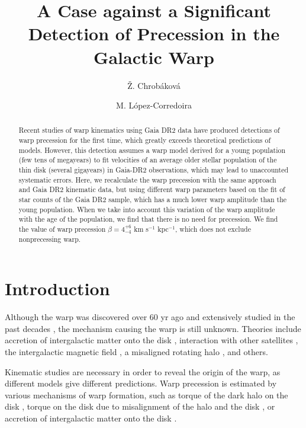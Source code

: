 \documentclass[twocolumn]{aastex63}
\begin{document}
	
	\title{A Case against a Significant Detection of Precession in the Galactic Warp}
	
	\author{\v{Z}. Chrob\'{a}kov\'{a}}
	
	\author{M. L\'{o}pez-Corredoira}
	
	\begin{abstract}
		Recent studies of warp kinematics using Gaia DR2 data have produced detections of warp precession for the first time, which greatly exceeds theoretical predictions of models. However, this detection assumes a warp model derived for a young population (few tens of megayears) to fit velocities of an average older stellar population of the thin disk (several gigayears) in Gaia-DR2 observations, which may lead to unaccounted systematic errors.
		Here, we recalculate the warp precession with the same approach and Gaia DR2 kinematic data, but using different warp parameters based on the fit of star counts of the Gaia DR2 sample, which has a much lower warp amplitude than the young population. When we take into account this variation of the warp amplitude with the age of the population, we find that there is no need for precession. We find the value of warp precession $\beta = 4^{+6}_{-4}$ km s$^{-1}$ kpc$^{-1}$, which does not exclude nonprecessing warp.
	\end{abstract}
	
	
\section{Introduction}\label{intro}
Although the warp was discovered over 60 yr ago \citep{kerr,oort} and extensively studied in the past decades \citep[and others]{carney,martin_warp,amores,chen}, the mechanism causing the warp is still unknown. Theories include accretion of intergalactic matter onto the disk \citep{martin_accretion}, interaction with other satellites \citep{kim}, the intergalactic magnetic field \citep{battaner}, a misaligned rotating halo \citep{debattista}, and others. 

Kinematic studies are necessary in order to reveal the origin of the warp, as different models give different predictions. Warp precession is estimated by various mechanisms of warp formation, such as torque of the dark halo on the disk \citep{dubinski}, torque on the disk due to misalignment of the halo and the disk \citep{jiang}, or accretion of intergalactic matter onto the disk \citep{martin_accretion,jeon}.
\end{document}
